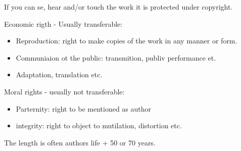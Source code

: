 \documentclass[12pt]{article} %
\begin{document}
\par If you can se, hear and/or touch the work it is protected under copyright.


Economic rigth - Usually transferable:
\begin{itemize}
    \item Reproduction: right to make copies of the work in any manner or form.
    \item Communiaion ot the public: transmition, publiv performance et.
    \item Adaptation, translation etc.
\end{itemize}

Moral rights - usually not transferable:
\begin{itemize}
    \item Parternity: right to be mentioned as author
    \item integrity: right to object to mutilation, distortion etc.
\end{itemize}

The length is often authors life + 50 or 70 years.
\end{document}
